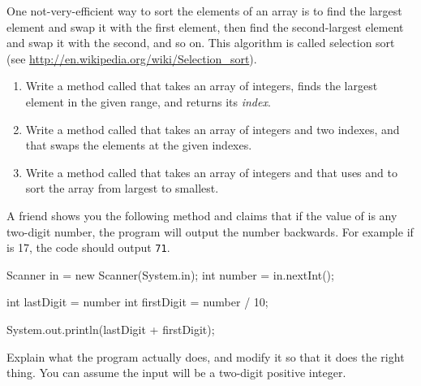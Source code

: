 \begin{exercise}
One not-very-efficient way to sort the elements of an array is to find the largest element and swap it with the first element, then find the second-largest element and swap it with the second, and so on.
This algorithm is called selection sort (see \url{http://en.wikipedia.org/wiki/Selection_sort}).

\begin{enumerate}

\item Write a method called  that takes an array of integers, finds the largest element in the given range, and returns its {\em index}.

\item Write a method called  that takes an array of integers and two indexes, and that swaps the elements at the given indexes.

\item Write a method called  that takes an array of integers and that uses  and  to sort the array from largest to smallest.

\end{enumerate}

\end{exercise}


\begin{exercise}

A friend shows you the following method and claims that if the value of  is any two-digit number, the program will output the number backwards.
For example if  is 17, the code should output {\tt 71}.

\begin{code}
    Scanner in = new Scanner(System.in);
    int number = in.nextInt();

    int lastDigit = number %
    int firstDigit = number / 10;

    System.out.println(lastDigit + firstDigit);
\end{code}

Explain what the program actually does, and modify it so that it does the right thing.
You can assume the input will be a two-digit positive integer.

\end{exercise}


